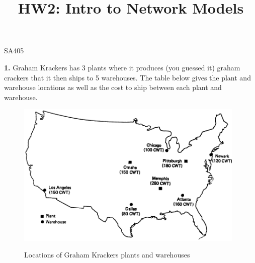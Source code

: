 \documentclass[11pt]{article}
\makeatletter
\theoremstyle{definition}
\renewcommand{\maketitle}{
  \noindent SA405 

  \begin{center}\Large{\textbf{\@title}}\end{center}
}
\makeatother
\begin{document}
\title{HW2: Intro to Network Models}

\maketitle

\textbf{1.} Graham Krackers has 3 plants where it produces (you guessed it) graham crackers that it then ships to 5 warehouses. The table below gives the plant and warehouse locations as well as the cost to ship between each plant and warehouse.

\begin{figure}[h!!!]
    \centering
    \includegraphics[width=4.3in]{map}\\
    \caption{Locations of Graham Krackers plants and warehouses}
\end{figure}
\end{document}
